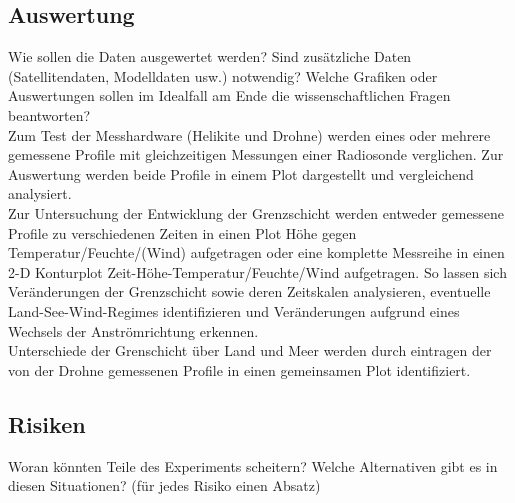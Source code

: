 \documentclass[a4paper,11pt,DIV=calc,tablecaptionabove,headinclude,twoside]{article}
\begin{document}
\subsection{Auswertung}
Wie sollen die Daten ausgewertet werden? Sind zusätzliche Daten (Satellitendaten, Modelldaten usw.) notwendig? Welche Grafiken oder Auswertungen sollen im Idealfall am Ende die wissenschaftlichen Fragen beantworten?\\

Zum Test der Messhardware (Helikite und Drohne) werden eines oder mehrere gemessene Profile 
mit gleichzeitigen Messungen einer Radiosonde verglichen. Zur Auswertung werden beide Profile
in einem Plot dargestellt und vergleichend analysiert.\\
Zur Untersuchung der Entwicklung der Grenzschicht werden entweder gemessene Profile zu verschiedenen 
Zeiten in einen Plot Höhe gegen Temperatur/Feuchte/(Wind) aufgetragen oder eine komplette Messreihe in einen 
2-D Konturplot Zeit-Höhe-Temperatur/Feuchte/Wind aufgetragen. So lassen sich Veränderungen der Grenzschicht sowie
deren Zeitskalen analysieren, eventuelle Land-See-Wind-Regimes identifizieren und Veränderungen aufgrund eines 
Wechsels der Anströmrichtung erkennen.\\
Unterschiede der Grenschicht über Land und Meer werden durch eintragen der von der Drohne gemessenen Profile 
in einen gemeinsamen Plot identifiziert.\\

\subsection{Risiken}
\label{Risiken}
Woran könnten Teile des Experiments scheitern? Welche Alternativen gibt es in diesen Situationen? (für jedes Risiko einen Absatz)\\
\end{document}
